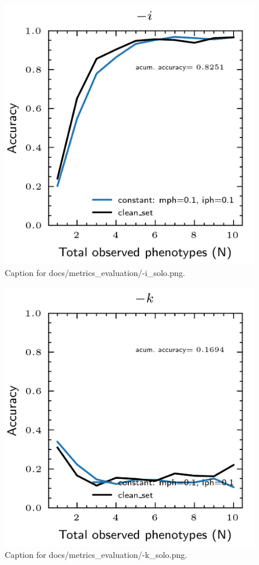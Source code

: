 \documentclass{article}
\begin{document}
\begin{figure}[h] \centering \includegraphics{docs/metrics_evaluation/-i_solo.png} \caption{Caption for docs/metrics_evaluation/-i_solo.png.} \end{figure}
\begin{figure}[h] \centering \includegraphics{docs/metrics_evaluation/-k_solo.png} \caption{Caption for docs/metrics_evaluation/-k_solo.png.} \end{figure}
\end{document}
